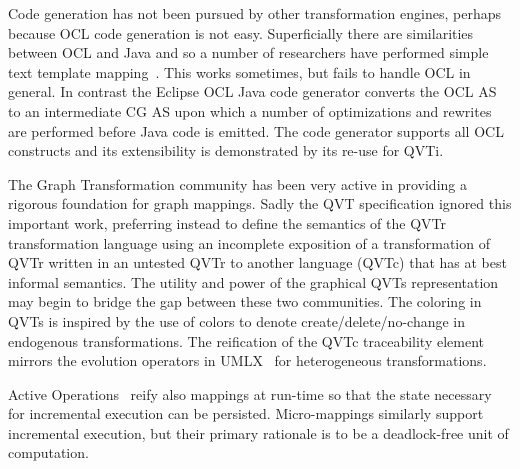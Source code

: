 \documentclass{llncs}
\begin{document}
Code generation has not been pursued by other transformation engines, perhaps because OCL code generation is not easy. Superficially there are similarities between OCL and Java and so a number of researchers have performed simple text template mapping~\cite{Wilke-CG}. This works sometimes, but fails to handle OCL in general. In contrast the Eclipse OCL Java code generator converts the OCL AS to an intermediate CG AS upon which a number of optimizations and rewrites are performed before Java code is emitted. The code generator supports all OCL constructs and its extensibility is demonstrated by its re-use for QVTi.

The Graph Transformation community has been very active in providing a rigorous foundation for graph mappings. Sadly the QVT specification ignored this important work, preferring instead to define the semantics of the QVTr transformation language using an incomplete exposition of a transformation of QVTr written in an untested QVTr to another language (QVTc) that has at best informal semantics. The utility and power of the graphical QVTs representation may begin to bridge the gap between these two communities. The coloring in QVTs is inspired by the use of colors to denote create/delete/no-change in endogenous transformations. The reification of the QVTc traceability element mirrors the evolution operators in UMLX~\cite{UMLX} for heterogeneous transformations.

Active Operations~\cite{Jouault-ActiveOperations} reify also mappings at run-time so that the state necessary for incremental execution can be persisted. Micro-mappings similarly support incremental execution, but their primary rationale is to be a deadlock-free unit of computation.




\end{document}
